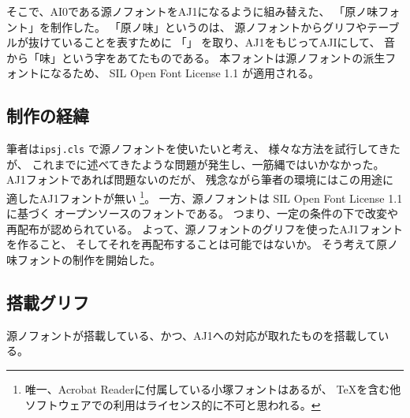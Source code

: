 そこで、AI0である源ノフォントをAJ1になるように組み替えた、
「原ノ味フォント」\cite{haranoaji}を制作した。
「原ノ味」というのは、
源ノフォントからグリフやテーブルが抜けていることを表すために
「」
を取り、AJ1をもじってAJIにして、
音から「味」という字をあてたものである。
本フォントは源ノフォントの派生フォントになるため、
SIL Open Font License 1.1 \cite{sil-ofl}が適用される。

\subsection{制作の経緯}

筆者は\texttt{ipsj.cls} \cite{ipsj.cls}で源ノフォントを使いたいと考え、
様々な方法を試行してきたが、
これまでに述べてきたような問題が発生し、一筋縄ではいかなかった。
AJ1フォントであれば問題ないのだが、
残念ながら筆者の環境にはこの用途に適したAJ1フォントが無い
\footnote{唯一、Acrobat Readerに付属している小塚フォントはあるが、
  \TeX を含む他ソフトウェアでの利用はライセンス的に不可と思われる。}。
一方、源ノフォントは
SIL Open Font License 1.1に基づく
オープンソースのフォントである。
つまり、一定の条件の下で改変や再配布が認められている。
よって、源ノフォントのグリフを使ったAJ1フォントを作ること、
そしてそれを再配布することは可能ではないか。
そう考えて原ノ味フォントの制作を開始した。

\subsection{搭載グリフ}
\label{sec:glyphs}

源ノフォントが搭載している、かつ、AJ1への対応が取れたものを搭載している。

